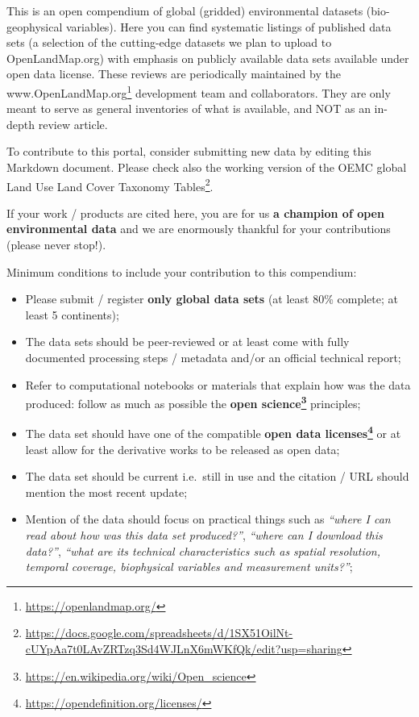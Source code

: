 \documentclass[
  graybox,natbib,nospthms]{svmono}
\providecommand{\tightlist}{%
  \setlength{\itemsep}{0pt}\setlength{\parskip}{0pt}}
\providecommand{\tightlist}{\setlength{\itemsep}{0pt}\setlength{\parskip}{0pt}}
\renewcommand{\href}[2]{#2 (\url{#1})}
\renewcommand{\href}[2]{#2\footnote{\url{#1}}}
\begin{document}
This is an open compendium of global (gridded) environmental datasets (bio-geophysical variables). Here you can
find systematic listings of published data sets (a selection of the cutting-edge datasets we plan to upload to OpenLandMap.org)
with emphasis on publicly available data sets available under open data license. These reviews are periodically
maintained by the \href{https://openlandmap.org/}{www.OpenLandMap.org} development team and
collaborators. They are only meant to serve as general inventories of what is
available, and NOT as an in-depth review article.

To contribute to this portal, consider submitting new data by editing this Markdown document.
Please check also the working version of the \href{https://docs.google.com/spreadsheets/d/1SX51OilNt-cUYpAa7t0LAvZRTzq3Sd4WJLnX6mWKfQk/edit?usp=sharing}{OEMC global Land Use Land Cover Taxonomy Tables}.

If your work / products are cited here, you are for us \textbf{a champion of open environmental data} and
we are enormously thankful for your contributions (please never stop!).

Minimum conditions to include your contribution to this compendium:

\begin{itemize}
\tightlist
\item
  Please submit / register \textbf{only global data sets} (at least 80\% complete; at least 5 continents);
\item
  The data sets should be peer-reviewed or at least come with fully documented processing steps / metadata and/or an official technical report;
\item
  Refer to computational notebooks or materials that explain how was the data produced: follow as much as possible the \textbf{\href{https://en.wikipedia.org/wiki/Open_science}{open science}} principles;
\item
  The data set should have one of the compatible \textbf{\href{https://opendefinition.org/licenses/}{open data licenses}} or at least allow for the derivative works to be released as open data;
\item
  The data set should be current i.e.~still in use and the citation / URL should mention the most recent update;
\item
  Mention of the data should focus on practical things such as \emph{``where I can read about how was this data set produced?''}, \emph{``where can I download this data?''}, \emph{``what are its technical characteristics such as spatial resolution, temporal coverage, biophysical variables and measurement units?''};
\end{itemize}
\end{document}

